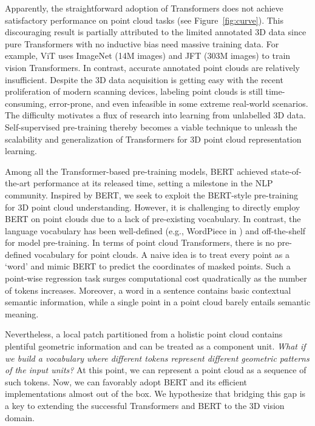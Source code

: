 Apparently, the straightforward adoption of Transformers does not achieve satisfactory performance on point cloud tasks (see Figure~\ref{fig:curve}). This discouraging result is partially attributed to the limited annotated 3D data since pure Transformers with no inductive bias need massive training data. For example, ViT\cite{vit} uses ImageNet\cite{CNN} (14M images) and JFT\cite{jft} (303M images) to train vision Transformers. In contrast, accurate annotated point clouds are relatively insufficient. Despite the 3D data acquisition is getting easy with the recent proliferation of modern scanning devices, labeling point clouds is still time-consuming, error-prone, and even infeasible in some extreme real-world scenarios. The difficulty motivates a flux of research into learning from unlabelled 3D data.  Self-supervised pre-training thereby becomes a viable technique to unleash the scalability and generalization of Transformers for 3D point cloud representation learning.

Among all the Transformer-based pre-training models, BERT\cite{bert} achieved state-of-the-art performance at its released time, setting a milestone in the NLP community. Inspired by BERT\cite{bert}, we seek to exploit the BERT-style pre-training for 3D point cloud understanding.  However, it is challenging to directly employ BERT on point clouds due to a lack of pre-existing vocabulary. In contrast, the language vocabulary has been well-defined (e.g., WordPiece in \cite{bert}) and off-the-shelf for model pre-training. In terms of point cloud Transformers, there is no pre-defined vocabulary for point clouds.  A naive idea is to treat every point as a `word' and mimic BERT\cite{bert} to predict the coordinates of masked points.  Such a point-wise regression task surges computational cost quadratically as the number of tokens increases. Moreover, a word in a sentence contains basic contextual semantic information, while a single point in a point cloud barely entails semantic meaning. 
	
Nevertheless, a local patch partitioned from a holistic point cloud contains plentiful geometric information and can be treated as a component unit.   
\textit{What if we build a vocabulary where different tokens represent different geometric patterns of the input units?} 
At this point, we can represent a point cloud as a sequence of such tokens. Now, we can favorably adopt BERT and its efficient implementations almost out of the box. We hypothesize that bridging this gap is a key to extending the successful Transformers and BERT to the 3D vision domain. 

